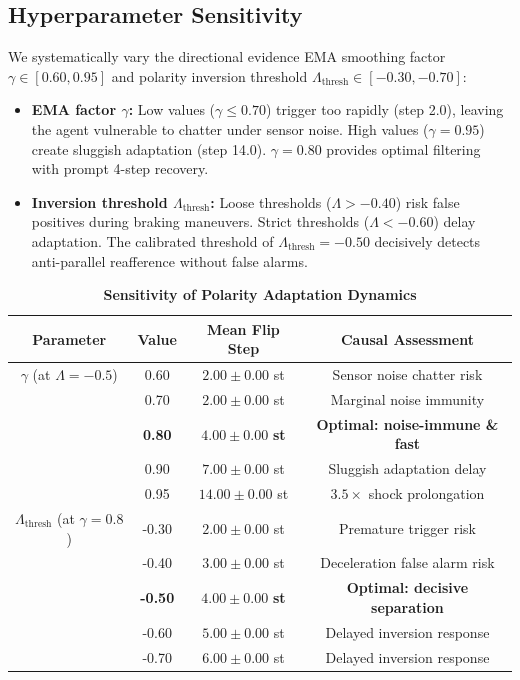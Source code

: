 \documentclass[10pt,twocolumn,a4paper]{article}
\begin{document}
\subsection{Hyperparameter Sensitivity}
We systematically vary the directional evidence EMA smoothing factor $\gamma \in [0.60, 0.95]$ and polarity inversion threshold $\Lambda_{\text{thresh}} \in [-0.30, -0.70]$:
\begin{itemize}
  \item \textbf{EMA factor $\gamma$:} Low values ($\gamma \le 0.70$) trigger too rapidly (step 2.0), leaving the agent vulnerable to chatter under sensor noise. High values ($\gamma = 0.95$) create sluggish adaptation (step 14.0). $\gamma = 0.80$ provides optimal filtering with prompt 4-step recovery.
  \item \textbf{Inversion threshold $\Lambda_{\text{thresh}}$:} Loose thresholds ($\Lambda > -0.40$) risk false positives during braking maneuvers. Strict thresholds ($\Lambda < -0.60$) delay adaptation. The calibrated threshold of $\Lambda_{\text{thresh}} = -0.50$ decisively detects anti-parallel reafference without false alarms.
\end{itemize}

\begin{table}[h]
\centering
\scriptsize
\caption{\textbf{Sensitivity of Polarity Adaptation Dynamics}}
\label{tab:sensitivity}
\begin{tabular}{cccc}
\toprule
\textbf{Parameter} & \textbf{Value} & \textbf{Mean Flip Step} & \textbf{Causal Assessment} \\
\midrule
$\gamma$ (at $\Lambda = -0.5$) & 0.60 & $2.00 \pm 0.00$ st & Sensor noise chatter risk \\
& 0.70 & $2.00 \pm 0.00$ st & Marginal noise immunity \\
& \textbf{0.80} & $\mathbf{4.00 \pm 0.00}$ \textbf{st} & \textbf{Optimal: noise-immune \& fast} \\
& 0.90 & $7.00 \pm 0.00$ st & Sluggish adaptation delay \\
& 0.95 & $14.00 \pm 0.00$ st & $3.5\times$ shock prolongation \\
\midrule
$\Lambda_{\text{thresh}}$ (at $\gamma = 0.8$) & -0.30 & $2.00 \pm 0.00$ st & Premature trigger risk \\
& -0.40 & $3.00 \pm 0.00$ st & Deceleration false alarm risk \\
& \textbf{-0.50} & $\mathbf{4.00 \pm 0.00}$ \textbf{st} & \textbf{Optimal: decisive separation} \\
& -0.60 & $5.00 \pm 0.00$ st & Delayed inversion response \\
& -0.70 & $6.00 \pm 0.00$ st & Delayed inversion response \\
\bottomrule
\end{tabular}
\end{table}
\end{document}
